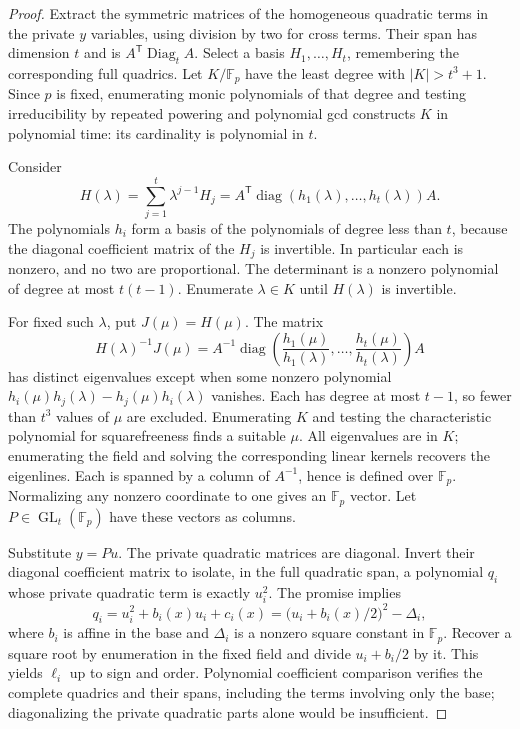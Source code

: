 \begin{proof}
Extract the symmetric matrices of the homogeneous quadratic terms in the private $y$ variables, using division by two for cross terms. Their span has dimension $t$ and is $A^{\mathsf T}\operatorname{Diag}_t A$. Select a basis $H_1,\ldots,H_t$, remembering the corresponding full quadrics. Let $K/\mathbb F_p$ have the least degree with $|K|>t^3+1$. Since $p$ is fixed, enumerating monic polynomials of that degree and testing irreducibility by repeated powering and polynomial gcd constructs $K$ in polynomial time: its cardinality is polynomial in $t$.

Consider
\[
 H(\lambda)=\sum_{j=1}^t\lambda^{j-1}H_j
       =A^{\mathsf T}\operatorname{diag}
          (h_1(\lambda),\ldots,h_t(\lambda))A.
\]
The polynomials $h_i$ form a basis of the polynomials of degree less than $t$, because the diagonal coefficient matrix of the $H_j$ is invertible. In particular each is nonzero, and no two are proportional. The determinant is a nonzero polynomial of degree at most $t(t-1)$. Enumerate $\lambda\in K$ until $H(\lambda)$ is invertible.

For fixed such $\lambda$, put $J(\mu)=H(\mu)$. The matrix
\[
 H(\lambda)^{-1}J(\mu)
 =A^{-1}\operatorname{diag}
       \left(\frac{h_1(\mu)}{h_1(\lambda)},\ldots,
             \frac{h_t(\mu)}{h_t(\lambda)}\right)A
\]
has distinct eigenvalues except when some nonzero polynomial
$h_i(\mu)h_j(\lambda)-h_j(\mu)h_i(\lambda)$ vanishes. Each has degree at most $t-1$, so fewer than $t^3$ values of $\mu$ are excluded. Enumerating $K$ and testing the characteristic polynomial for squarefreeness finds a suitable $\mu$. All eigenvalues are in $K$; enumerating the field and solving the corresponding linear kernels recovers the eigenlines. Each is spanned by a column of $A^{-1}$, hence is defined over $\mathbb F_p$. Normalizing any nonzero coordinate to one gives an $\mathbb F_p$ vector. Let $P\in\operatorname{GL}_t(\mathbb F_p)$ have these vectors as columns.

Substitute $y=Pu$. The private quadratic matrices are diagonal. Invert their diagonal coefficient matrix to isolate, in the full quadratic span, a polynomial $q_i$ whose private quadratic term is exactly $u_i^2$. The promise implies
\[
 q_i=u_i^2+b_i(x)u_i+c_i(x)
     =\bigl(u_i+b_i(x)/2\bigr)^2-\Delta_i,
\]
where $b_i$ is affine in the base and $\Delta_i$ is a nonzero square constant in $\mathbb F_p$. Recover a square root by enumeration in the fixed field and divide $u_i+b_i/2$ by it. This yields $\ell_i$ up to sign and order. Polynomial coefficient comparison verifies the complete quadrics and their spans, including the terms involving only the base; diagonalizing the private quadratic parts alone would be insufficient.


\end{proof}
